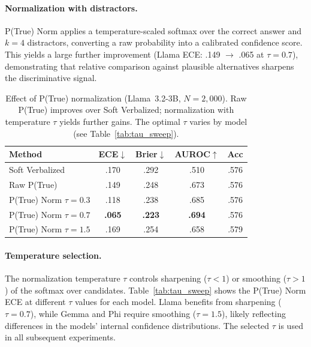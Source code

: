 \paragraph{Normalization with distractors.}
P(True) Norm applies a temperature-scaled softmax over the correct 
answer and $k{=}4$ distractors, converting a raw probability into a 
calibrated confidence score.
This yields a large further improvement (Llama ECE: .149 $\to$ .065 
at $\tau{=}0.7$), demonstrating that relative comparison against 
plausible alternatives sharpens the discriminative signal.

\begin{table}[h]
\centering
\caption{Effect of P(True) normalization (Llama~3.2-3B, $N{=}2{,}000$).
Raw P(True) improves over Soft Verbalized; normalization with 
temperature $\tau$ yields further gains.
The optimal $\tau$ varies by model (see Table~\ref{tab:tau_sweep}).}
\label{tab:ptrue_raw_vs_norm}
\small
\begin{tabular}{@{}lcccc@{}}
\toprule
\textbf{Method}
  & \textbf{ECE}$\downarrow$ & \textbf{Brier}$\downarrow$
  & \textbf{AUROC}$\uparrow$ & \textbf{Acc} \\
\midrule
Soft Verbalized        & .170 & .292 & .510 & .576 \\
Raw P(True)            & .149 & .248 & .673 & .576 \\
P(True) Norm $\tau{=}0.3$ & .118 & .238 & .685 & .576 \\
P(True) Norm $\tau{=}0.7$ & \textbf{.065} & \textbf{.223} & \textbf{.694} & .576 \\
P(True) Norm $\tau{=}1.5$ & .169 & .254 & .658 & .579 \\
\bottomrule
\end{tabular}
\end{table}

\paragraph{Temperature selection.}
The normalization temperature $\tau$ controls sharpening ($\tau{<}1$) 
or smoothing ($\tau{>}1$) of the softmax over candidates.
Table~\ref{tab:tau_sweep} shows the P(True) Norm ECE at different 
$\tau$ values for each model.
Llama benefits from sharpening ($\tau{=}0.7$), while Gemma and Phi 
require smoothing ($\tau{=}1.5$), likely reflecting differences in 
the models' internal confidence distributions.
The selected $\tau$ is used in all subsequent experiments.

